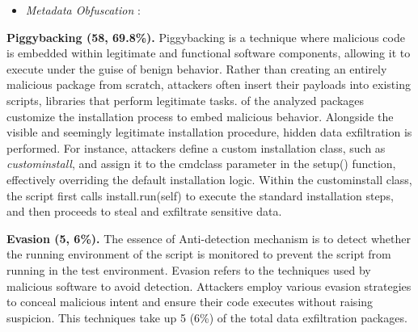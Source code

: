 \begin{itemize}
    \item \textit{Metadata Obfuscation} : 
\end{itemize}

\textbf{Piggybacking {(58, 69.8\%)}.} Piggybacking is a technique where malicious code is embedded within legitimate and functional software components, allowing it to execute under the guise of benign behavior. Rather than creating an entirely malicious package from scratch, attackers often insert their payloads into existing scripts, libraries that perform legitimate tasks.  of the analyzed packages customize the installation process to embed malicious behavior. Alongside the visible and seemingly legitimate installation procedure, hidden data exfiltration is performed. For instance, attackers define a custom installation class, such as \textit{custominstall}, and assign it to the cmdclass parameter in the setup() function, effectively overriding the default installation logic. Within the custominstall class, the script first calls install.run(self) to execute the standard installation steps, and then proceeds to steal and exfiltrate sensitive data.

\textbf{Evasion (5, 6\%).} The essence of Anti-detection mechanism is to detect whether the running environment of the script is monitored to prevent the script from running in the test environment. Evasion refers to the techniques used by malicious software to avoid detection. Attackers employ various evasion strategies to conceal malicious intent and ensure their code executes without raising suspicion. This techniques take up 5 (6\%) of the total data exfiltration packages. 

